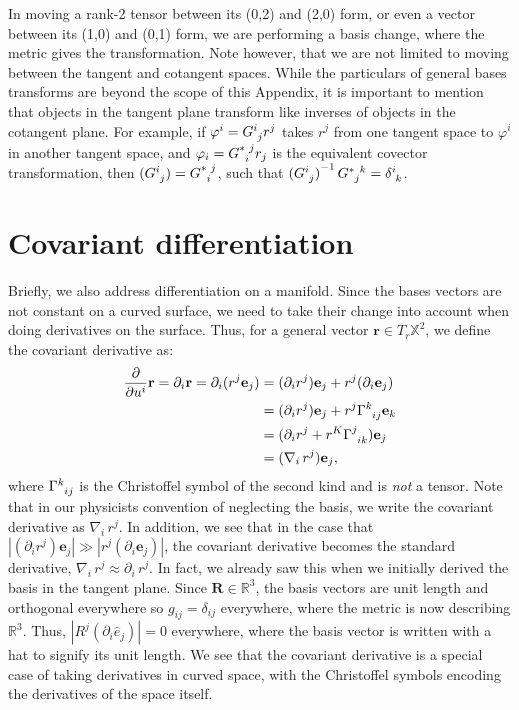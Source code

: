 \begin{appendices}
In moving a rank-2 tensor between its (0,2) and (2,0) form, or even a vector between its (1,0) and (0,1) form, we are performing a basis change, where the metric gives the transformation.
Note however, that we are not limited to moving between the tangent and cotangent spaces.
While the particulars of general bases transforms are beyond the scope of this Appendix, it is important to mention that objects in the tangent plane transform like inverses of objects in the cotangent plane.
For example, if $\varphi^i = \tensor{G}{^i_j}r^j$ takes $r^j$ from one tangent space to $\varphi^i$ in another tangent space, and $\varphi_i = \tensor{G}{^*_i^j}r_j$ is the equivalent covector transformation, then $(\tensor{G}{^i_j}) = \tensor{G}{^*_i^j}$, such that ${(\tensor{G}{^i_j})}^{-1}\,\tensor{G}{^*_j^k} = \tensor{\delta}{^i_k}$.



\section{Covariant differentiation}
Briefly, we also address differentiation on a manifold.
Since the bases vectors are not constant on a curved surface, we need to take their change into account when doing derivatives on the surface.
Thus, for a general vector $\mathbf{r} \in T_r\mathbb{X}^2$, we define the covariant derivative as:
\begin{align}
  \frac{\partial}{\partial u^i} \mathbf{r} = \partial_i \mathbf{r} = \partial_i (r^j \mathbf{e}_j) &= (\partial_i r^j)\mathbf{e}_j + r^j(\partial_i \mathbf{e}_j) \nonumber \\
  &= (\partial_i r^j)\mathbf{e}_j + r^j \tensor{\Gamma}{^k_{ij}} \mathbf{e}_k \nonumber \\
  &= (\partial_i r^j + r^K \tensor{\Gamma}{^j_{ik}}) \mathbf{e}_j \nonumber \\
  &= (\nabla_i\,r^j)\mathbf{e}_j,
\end{align}
where $\tensor{\Gamma}{^k_{ij}}$ is the Christoffel symbol of the second kind and is \emph{not} a tensor.
Note that in our physicists convention of neglecting the basis, we write the covariant derivative as $\nabla_i\,r^j$.
In addition, we see that in the case that $|(\partial_i r^j)\mathbf{e}_j| \gg |r^j(\partial_i \mathbf{e}_j)|$, the covariant derivative becomes the standard derivative, $\nabla_i\,r^j \approx \partial_i \, r^j$.
In fact, we already saw this when we initially derived the basis in the tangent plane.
Since $\mathbf{R} \in \mathbb{R}^3$, the basis vectors are unit length and orthogonal everywhere so  $g_{ij} = \delta_{ij}$ everywhere, where the metric is now describing $\mathbb{R}^3$.
Thus, $|R^j(\partial_i \hat{e}_j)| = 0$ everywhere, where the basis vector is written with a hat to signify its unit length.
We see that the covariant derivative is a special case of taking derivatives in curved space, with the Christoffel symbols encoding the derivatives of the space itself.





\end{appendices}
